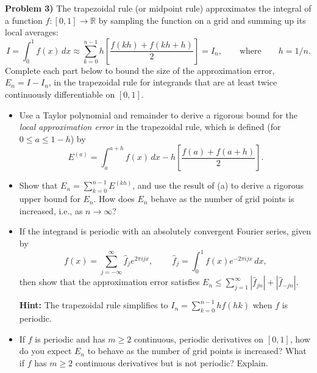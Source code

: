 \documentclass[12pt]{article}
\begin{document}
\noindent
\textbf{Problem 3)} The trapezoidal rule (or midpoint rule) approximates the integral of a function $f:[0,1]\rightarrow\mathbb{R}$ by sampling the function on a grid and summing up its local averages:
$$
I = \int_0^1 f(x)\,dx \approx \sum_{k=0}^{n-1} h\left[\frac{f(kh) + f(kh+h)}{2}\right]=I_n, \qquad \text{where}\qquad h = 1/n.
$$
Complete each part below to bound the size of the approximation error, $E_n = I-I_n$, in the trapezoidal rule for integrands that are at least twice continuously differentiable on $[0,1]$.
\begin{itemize}
    \item[(a)] Use a Taylor polynomial and remainder to derive a rigorous bound for the \textit{local approximation error} in the trapezoidal rule, which is defined (for $0\leq a\leq 1-h$) by
    $$
    E^{(a)} = \int_a^{a+h}f(x)\,dx - h\left[\frac{f(a)+f(a+h)}{2}\right].
    $$

    \item[(b)] Show that $E_n = \sum_{k=0}^{n-1}E^{(kh)}$, and use the result of (a) to derive a rigorous upper bound for $E_n$. How does $E_n$ behave as the number of grid points is increased, i.e., as $n\rightarrow\infty$?

    \item[(c)] If the integrand is periodic with an absolutely convergent Fourier series, given by
    $$
    f(x)=\sum_{j=-\infty}^\infty \hat f_j e^{2\pi i j x}, \qquad\ \hat f_j = \int_0^1 f(x)e^{-2\pi i j x}\,dx,
    $$
    then show that the approximation error satisfies $E_n\leq \sum_{j=1}^\infty |\hat f_{jn}|+|\hat f_{-jn}|$.

    \medskip
    \noindent
    \textbf{Hint:} The trapezoidal rule simplifies to $I_n = \sum_{k=0}^{n-1} hf(hk)$ when $f$ is periodic.
    
    \item[(d)] If $f$ is periodic and has $m\geq 2$ continuous, periodic derivatives on $[0,1]$, how do you expect $E_n$ to behave as the number of grid points is increased? What if $f$ has $m\geq 2$ continuous derivatives but is not periodic? Explain. 
    
\end{itemize}
\end{document}
